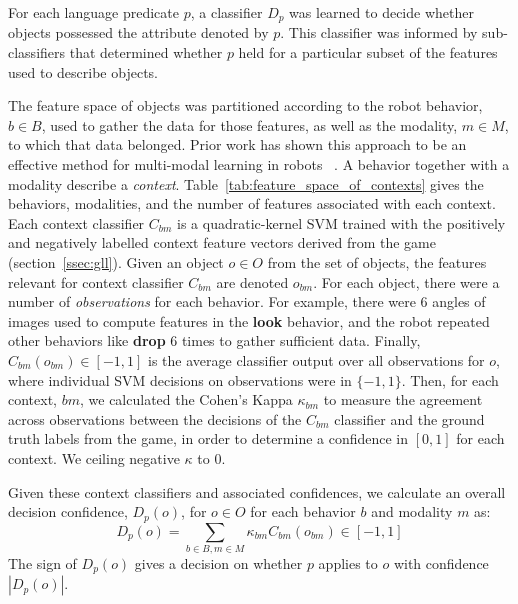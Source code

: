 For each language predicate $p$, a classifier $D_p$ was learned to decide
whether objects possessed the attribute denoted by $p$.  This classifier was
informed by sub-classifiers that determined whether $p$ held for a particular
subset of the features used to describe objects.

The feature space of objects was partitioned according to the robot behavior,
$b\in B$, used to gather the data for those features, as well as the modality,
$m\in M$, to which that data belonged.  Prior work has shown this approach to
be an effective method for multi-modal learning in robots
~\cite{sinapov:icra14}.  A behavior together with a modality describe a
\textit{context}.  Table~\ref{tab:feature_space_of_contexts} gives the
behaviors, modalities, and the number of features associated with each context.
Each context classifier $C_{bm}$ is a quadratic-kernel SVM trained with the
positively and negatively labelled context feature vectors derived from the
\ispy game (section~\ref{ssec:gll}).  Given an object $o\in O$ from the set of
objects, the features relevant for context classifier $C_{bm}$ are denoted
$o_{bm}$.  For each object, there were a number of \textit{observations} for
each behavior.  For example, there were 6 angles of images used to compute
features in the \textbf{look} behavior, and the robot repeated other behaviors
like \textbf{drop} 6 times to gather sufficient data.  Finally,
$C_{bm}(o_{bm})\in [-1,1]$ is the average classifier output over all
observations for $o$, where individual SVM decisions on observations were in
$\{-1,1\}$. Then, for each context, $bm$, we calculated the Cohen's Kappa
$\kappa_{bm}$ to measure the agreement across observations between the
decisions of the $C_{bm}$ classifier and the ground truth labels from the \ispy
game, in order to determine a confidence in $[0,1]$ for each context.  We
ceiling negative $\kappa$ to $0$.

Given these context classifiers and associated confidences, we calculate an
overall decision confidence, $D_p(o)$,
for $o\in O$ for each behavior $b$ and modality $m$ as:
\begin{equation}
	D_p(o) = \sum_{b\in B,m\in M}{\kappa_{bm} C_{bm}(o_{bm})} \in [-1,1]
\end{equation}
The sign of $D_p(o)$ gives a decision on whether $p$ applies to $o$ with
confidence $|D_p(o)|$.

